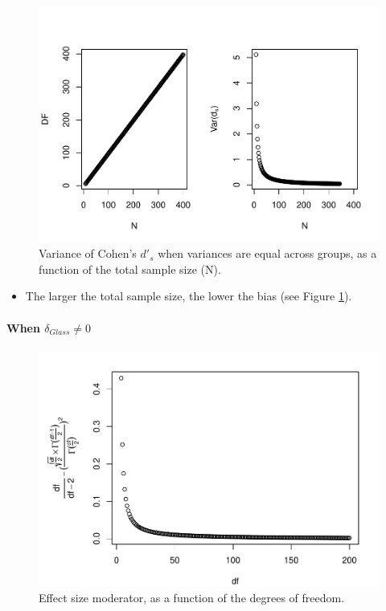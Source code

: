 \documentclass[
  man]{apa6}
\providecommand{\tightlist}{%
  \setlength{\itemsep}{0pt}\setlength{\parskip}{0pt}}
\begin{document}
\begin{figure}
\centering
\includegraphics{Theoretical-Variance-of-all-estimators-as-a-function-of-population-parameters_files/figure-latex/varcohendprimehomNsize2-1.pdf}
\caption{\label{fig:varcohendprimehomNsize2}Variance of Cohen's \(d'_s\) when variances are equal across groups, as a function of the total sample size (N).}
\end{figure}

\begin{itemize}
\tightlist
\item
  The larger the total sample size, the lower the bias (see Figure \ref{fig:varcohendprimehomNsize2}).
\end{itemize}

\hypertarget{when-delta_glass-neq-0-3}{%
\paragraph{\texorpdfstring{When \(\delta_{Glass} \neq 0\)}{When \textbackslash delta\_\{Glass\} \textbackslash neq 0}}\label{when-delta_glass-neq-0-3}}

\begin{figure}
\centering
\includegraphics{Theoretical-Variance-of-all-estimators-as-a-function-of-population-parameters_files/figure-latex/ESmoderator2-1.pdf}
\caption{\label{fig:ESmoderator2}Effect size moderator, as a function of the degrees of freedom.}
\end{figure}
\end{document}
